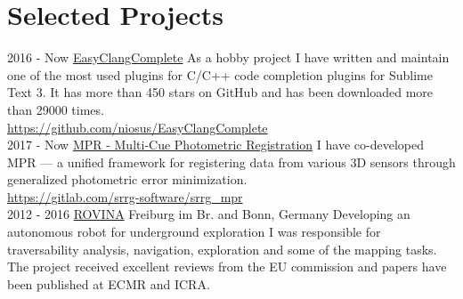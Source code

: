 \documentclass[]{friggeri-cv}
\begin{document}
\section{Selected Projects}
\begin{entrylist}
  \entry
    {2016 - Now}
    {\href{https://github.com/niosus/EasyClangComplete}{EasyClangComplete}}
    {}
    {As a hobby project I have written and maintain one of the most used plugins for C/C++ code completion plugins for Sublime Text 3. It has more than 450 stars on GitHub and has been downloaded more than 29000 times.\\\url{https://github.com/niosus/EasyClangComplete}\\}
  \entry
    {2017 - Now}
    {\href{https://gitlab.com/srrg-software/srrg_mpr}{MPR - Multi-Cue Photometric Registration}}
    {}
    {I have co-developed MPR --- a unified framework for registering data from various 3D sensors through generalized photometric error minimization.\\\url{https://gitlab.com/srrg-software/srrg_mpr}\\}
  \entry
    {2012 - 2016}
    {\href{http://www.rovina-project.eu/}{ROVINA}}
    {Freiburg im Br. and Bonn, Germany}
    {Developing an autonomous robot for underground exploration I was responsible for traversability analysis, navigation, exploration and some of the mapping tasks. The project received excellent reviews from the EU commission and papers have been published at ECMR and ICRA.}
\end{entrylist}
\newpage
\end{document}

